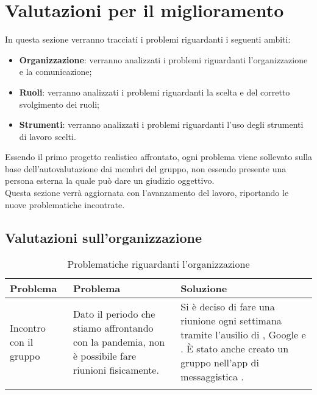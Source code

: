 \section{Valutazioni per il miglioramento}
In questa sezione verranno tracciati i problemi riguardanti i seguenti ambiti:
\begin{itemize}
	\item \textbf{Organizzazione}: verranno analizzati i problemi riguardanti l'organizzazione e la comunicazione;
	\item \textbf{Ruoli}: verranno analizzati i problemi riguardanti la scelta e del corretto svolgimento dei ruoli;
	\item \textbf{Strumenti}: verranno analizzati i problemi riguardanti l'uso degli strumenti di lavoro scelti.
\end{itemize}
Essendo il primo progetto realistico affrontato, ogni problema viene sollevato sulla base dell'autovalutazione dai membri del gruppo, non essendo presente una persona esterna la quale può dare un giudizio oggettivo.\\
Questa sezione verrà aggiornata con l'avanzamento del lavoro, riportando le nuove problematiche incontrate.
	\subsection{Valutazioni sull'organizzazione}
	\begin{center}
		\begin{longtable}{|C{2cm}|p{6cm}|p{6cm}|}
			\hline
			\textbf{Problema} & \textbf{Problema} & \textbf{Soluzione}  \\ 			
			\hline
			\endhead
			
			\hline
			Incontro con il gruppo & Dato il periodo che stiamo affrontando con la pandemia, non è possibile fare riunioni fisicamente. & Si è deciso di fare una riunione ogni settimana tramite l'ausilio di , Google  e . È stato anche creato un gruppo nell'app di messaggistica .\\
			\hline			
			\hiderowcolors
			\caption{Problematiche riguardanti l'organizzazione}		
		\end{longtable}	
	\end{center}
